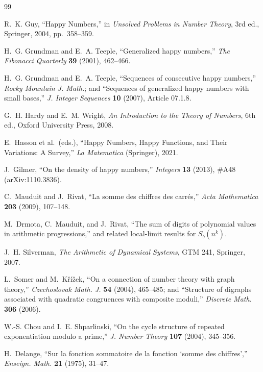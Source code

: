 \documentclass[11pt]{article}
\theoremstyle{definition}
\theoremstyle{remark}
\begin{document}
\begin{thebibliography}{99}

 R.~K. Guy, ``Happy Numbers,'' in \emph{Unsolved Problems in Number Theory}, 3rd ed., Springer, 2004, pp.~358--359.

 H.~G. Grundman and E.~A. Teeple, ``Generalized happy numbers,'' \emph{The Fibonacci Quarterly} \textbf{39} (2001), 462--466.

 H.~G. Grundman and E.~A. Teeple, ``Sequences of consecutive happy numbers,'' \emph{Rocky Mountain J. Math.}; and ``Sequences of generalized happy numbers with small bases,'' \emph{J. Integer Sequences} \textbf{10} (2007), Article 07.1.8.

 G.~H. Hardy and E.~M. Wright, \emph{An Introduction to the Theory of Numbers}, 6th ed., Oxford University Press, 2008.

 E.~Hasson et al.\ (eds.), ``Happy Numbers, Happy Functions, and Their Variations: A Survey,'' \emph{La Matematica} (Springer), 2021.

 J.~Gilmer, ``On the density of happy numbers,'' \emph{Integers} \textbf{13} (2013), \#A48 (arXiv:1110.3836).

 C.~Mauduit and J.~Rivat, ``La somme des chiffres des carr\'es,'' \emph{Acta Mathematica} \textbf{203} (2009), 107--148.

 M.~Drmota, C.~Mauduit, and J.~Rivat, ``The sum of digits of polynomial values in arithmetic progressions,'' and related local-limit results for $S_b(n^k)$.

 J.~H. Silverman, \emph{The Arithmetic of Dynamical Systems}, GTM 241, Springer, 2007.

 L.~Somer and M.~K\v{r}\'i\v{z}ek, ``On a connection of number theory with graph theory,'' \emph{Czechoslovak Math. J.} \textbf{54} (2004), 465--485; and ``Structure of digraphs associated with quadratic congruences with composite moduli,'' \emph{Discrete Math.} \textbf{306} (2006).

 W.-S. Chou and I.~E. Shparlinski, ``On the cycle structure of repeated exponentiation modulo a prime,'' \emph{J. Number Theory} \textbf{107} (2004), 345--356.

 H.~Delange, ``Sur la fonction sommatoire de la fonction `somme des chiffres','' \emph{Enseign. Math.} \textbf{21} (1975), 31--47.


\end{thebibliography}
\end{document}
